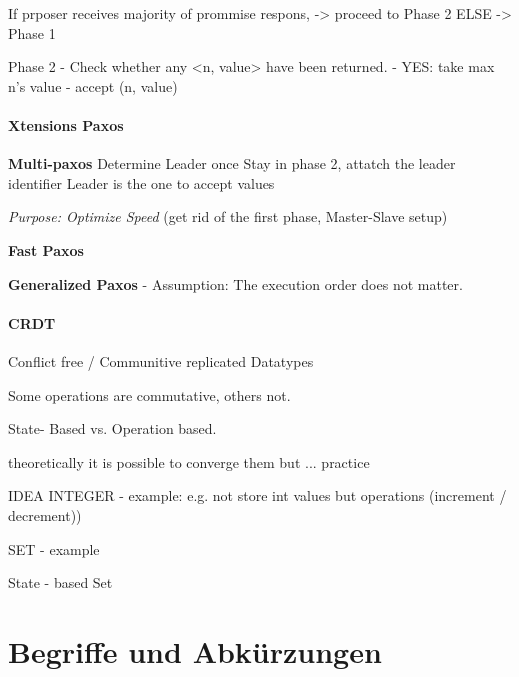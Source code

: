 \documentclass[a4paper,12pt]{article}%
\begin{document}
If prposer receives majority of prommise respons, -> proceed to Phase 2 ELSE -> Phase 1

Phase 2
- Check whether any <n, value> have been returned. 
- YES: take max n's value
- accept (n, value)

\paragraph{Xtensions Paxos}
	
	{\bf Multi-paxos}
	Determine Leader once
	Stay in phase 2, attatch the leader identifier
	Leader is the one to accept values
	
	{\it Purpose:  Optimize Speed} (get rid of the first phase, Master-Slave setup)
	
	
	{\bf Fast Paxos}
	
	{\bf Generalized Paxos}
	- Assumption: The execution order does not matter.

\paragraph{CRDT}
Conflict free / Communitive replicated Datatypes

Some operations are commutative, others not.

State- Based vs. Operation based.

theoretically it is possible to converge them but ... practice




IDEA
INTEGER  - example: 
e.g. not store int values but operations (increment / decrement))

SET - example

State - based Set
\fi

\section{Begriffe und Abkürzungen}
\end{document}
